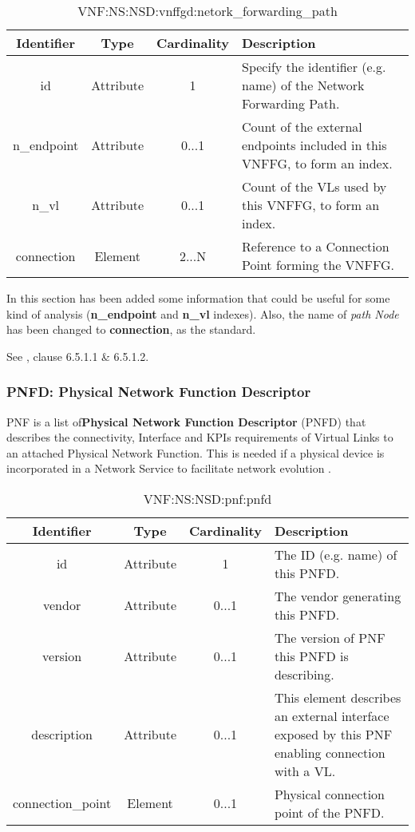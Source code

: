 \documentclass[11pt, english]{article}
\begin{document}
\begin{table}[ht]
    \centering
    \begin{tabular}{c|c|c|m{7cm}}
    \hline
    Identifier & Type & Cardinality & Description \\
    \hline
    \rowcolor{Gray}
    id & Attribute & 1 & Specify the identifier (e.g. name) of the Network Forwarding Path. \\
    \hline
    n\_endpoint & Attribute & 0...1 & Count of the external endpoints included in this VNFFG, to form an index. \\
    \hline
    \rowcolor{Gray}
    n\_vl & Attribute & 0...1 & Count of the VLs used by this VNFFG, to form an index. \\
    \hline
    connection & Element & 2...N & Reference to a Connection Point forming the VNFFG. \\
    \hline
    \end{tabular}
    \caption{VNF:NS:NSD:vnffgd:netork\_forwarding\_path} \label{tab:tab11}
\end{table}

In this section has been added some information that could be useful for some kind of analysis (\textbf{n\_endpoint} and \textbf{n\_vl} indexes).
Also, the name of \textit{path Node} has been changed to \textbf{connection}, as the standard. 

See \cite{etsi}, clause 6.5.1.1 \& 6.5.1.2.

\subsubsection{PNFD: Physical Network Function Descriptor}
PNF is a list of\textbf{Physical Network Function Descriptor} (PNFD) that describes the connectivity, Interface and KPIs requirements of Virtual Links to an attached Physical Network Function. This is needed if a physical device is incorporated in a Network Service to facilitate network evolution \cite{etsi}.

\begin{table}[ht]
    \centering
    \begin{tabular}{c|c|c|m{7cm}}
    \hline
    Identifier & Type & Cardinality & Description \\
    \hline
    \rowcolor{Gray}
    id & Attribute & 1 & The ID (e.g. name) of this PNFD. \\
    \hline
    vendor & Attribute & 0...1 & The vendor generating this PNFD. \\
    \hline
    \rowcolor{Gray}
    version & Attribute & 0...1 & The version of PNF this PNFD is describing. \\
    \hline
    description & Attribute & 0...1 &  This element describes an external interface exposed by this PNF enabling connection with a VL. \\
    \hline
    \rowcolor{Gray}
    connection\_point & Element & 0...1 & Physical connection point of the PNFD. \\
    \hline
    \end{tabular}
    \caption{VNF:NS:NSD:pnf:pnfd} \label{tab:tab12}
\end{table}
\end{document}
